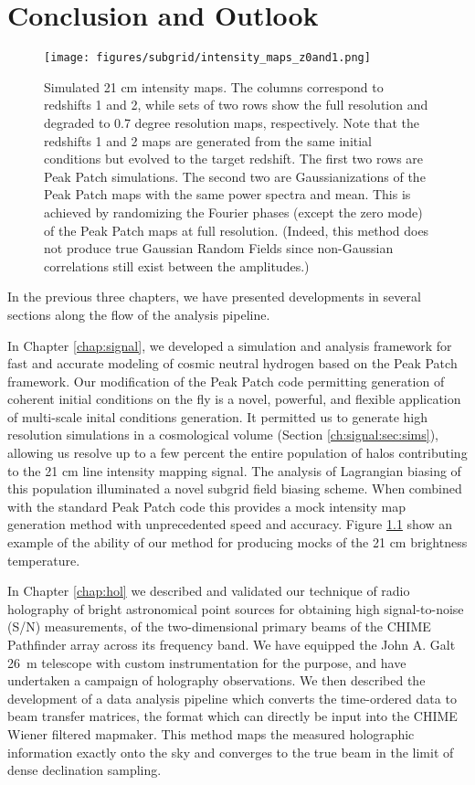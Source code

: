 \chapter{Conclusion and Outlook}
\label{chap:conclusion}


\begin{figure} %
\begin{center}
\texttt{[image: figures/subgrid/intensity\_maps\_z0and1.png]}
\caption{Simulated 21 cm intensity maps. The columns correspond to redshifts 1 and 2, while sets of two rows show the full resolution and degraded to 0.7 degree resolution maps, respectively. Note that the redshifts 1 and 2 maps are generated from the same initial conditions but evolved to the target redshift. The first two rows are Peak Patch simulations. The second two are Gaussianizations of the Peak Patch maps with the same power spectra and mean. This is achieved by randomizing the Fourier phases (except the zero mode) of the Peak Patch maps at full resolution. (Indeed, this method does not produce true Gaussian Random Fields since non-Gaussian correlations still exist between the amplitudes.)}
\label{intensitymaps}
\end{center}
\end{figure}

In the previous three chapters, we have presented developments in several sections along the flow of the analysis pipeline.

In Chapter \ref{chap:signal}, we developed a simulation and analysis framework for fast and accurate modeling of cosmic neutral hydrogen based on the Peak Patch framework. Our modification of the Peak Patch code permitting generation of coherent initial conditions on the fly is a novel, powerful, and flexible application of multi-scale inital conditions generation. It permitted us to generate high resolution simulations in a cosmological volume (Section \ref{ch:signal:sec:sims}), allowing us resolve up to a few percent the entire population of halos contributing to the 21 cm line intensity mapping signal. The analysis of Lagrangian biasing of this population illuminated a novel subgrid field biasing scheme. When combined with the standard Peak Patch code this provides a mock intensity map generation method with unprecedented speed and accuracy. Figure \ref{intensitymaps} show an example of the ability of our method for producing mocks of the 21 cm brightness temperature.

In Chapter \ref{chap:hol} we described and validated our technique of radio holography of bright astronomical point sources for obtaining high signal-to-noise (S/N) measurements, of the two-dimensional primary beams of the CHIME Pathfinder array across its frequency band. We have equipped the John A. Galt 26~m telescope with custom instrumentation for the purpose, and have undertaken a campaign of holography observations. We then described the development of a data analysis pipeline which converts the time-ordered data to beam transfer matrices, the format which can directly be input into the CHIME Wiener filtered mapmaker. This method maps the measured holographic information exactly onto the sky and converges to the true beam in the limit of dense declination sampling.


